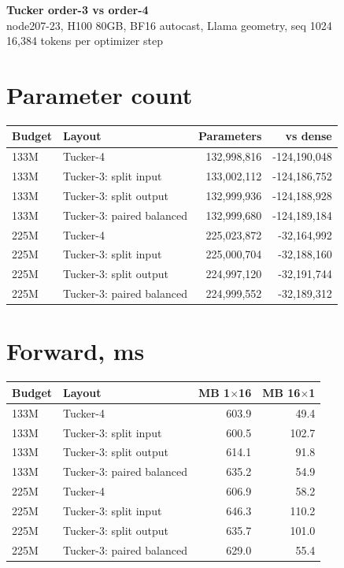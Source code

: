 \documentclass[10pt]{article}
\begin{document}
\begin{center}
{\LARGE\bfseries Tucker order-3 vs order-4}\\[3pt]
{\large node207-23, H100 80GB, BF16 autocast, Llama geometry, seq 1024}\\[2pt]
{16,384 tokens per optimizer step}
\end{center}
\section{Parameter count}
\begin{center}
\small
\begin{tabular}{llrr}
\toprule
\textbf{Budget} & \textbf{Layout} & \textbf{Parameters} & \textbf{vs dense} \\
\midrule
133M & Tucker-4 & 132,998,816 & -124,190,048 \\
133M & Tucker-3: split input & 133,002,112 & -124,186,752 \\
133M & Tucker-3: split output & 132,999,936 & -124,188,928 \\
133M & Tucker-3: paired balanced & 132,999,680 & -124,189,184 \\
225M & Tucker-4 & 225,023,872 & -32,164,992 \\
225M & Tucker-3: split input & 225,000,704 & -32,188,160 \\
225M & Tucker-3: split output & 224,997,120 & -32,191,744 \\
225M & Tucker-3: paired balanced & 224,999,552 & -32,189,312 \\
\bottomrule
\end{tabular}
\end{center}
\section{Forward, ms}
\begin{center}
\small
\begin{tabular}{llrr}
\toprule
\textbf{Budget} & \textbf{Layout} & \textbf{MB 1$\times$16} & \textbf{MB 16$\times$1} \\
\midrule
133M & Tucker-4 & 603.9 & 49.4 \\
133M & Tucker-3: split input & 600.5 & 102.7 \\
133M & Tucker-3: split output & 614.1 & 91.8 \\
133M & Tucker-3: paired balanced & 635.2 & 54.9 \\
225M & Tucker-4 & 606.9 & 58.2 \\
225M & Tucker-3: split input & 646.3 & 110.2 \\
225M & Tucker-3: split output & 635.7 & 101.0 \\
225M & Tucker-3: paired balanced & 629.0 & 55.4 \\
\bottomrule
\end{tabular}
\end{center}
\end{document}
